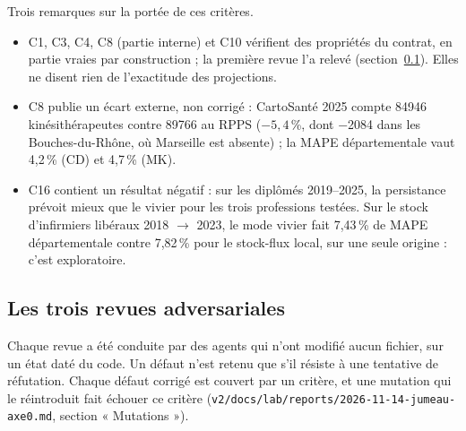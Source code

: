 Trois remarques sur la portée de ces critères.
\begin{itemize}
  \item C1, C3, C4, C8 (partie interne) et C10 vérifient des propriétés du contrat, en partie vraies par
        construction ; la première revue l'a relevé (section~\ref{jum:revues}). Elles ne disent rien de
        l'exactitude des projections.
  \item C8 publie un écart externe, non corrigé : CartoSanté 2025 compte \num{84946}\mesure{} kinésithérapeutes
        contre \num{89766}\mesure{} au RPPS ($-5{,}4$\mesure{}\,\%, dont \num{-2084}\mesure{} dans les
        Bouches-du-Rhône, où Marseille est absente) ; la MAPE départementale vaut 4,2\mesure{}\,\% (CD) et
        4,7\mesure{}\,\% (MK).
  \item C16 contient un résultat négatif : sur les diplômés 2019--2025, la persistance prévoit mieux que le
        vivier pour les trois professions testées. Sur le stock d'infirmiers libéraux 2018 $\to$ 2023, le mode
        vivier fait 7,43\mesure{}\,\% de MAPE départementale contre 7,82\mesure{}\,\% pour le stock-flux local,
        sur une seule origine : c'est exploratoire.
\end{itemize}

\subsection{Les trois revues adversariales}\label{jum:revues}

Chaque revue a été conduite par des agents qui n'ont modifié aucun fichier, sur un état daté du code. Un défaut
n'est retenu que s'il résiste à une tentative de réfutation. Chaque défaut corrigé est couvert par un critère, et
une mutation qui le réintroduit fait échouer ce critère (\texttt{v2/docs/lab/reports/2026-11-14-jumeau-axe0.md},
section « Mutations »).

